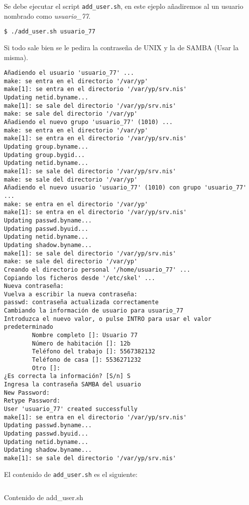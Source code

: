 \documentclass[../main.tex]{subfiles}
\begin{document}
Se debe ejecutar el script \texttt{add\_user.sh},
en este ejeplo añadiremos al un usuario nombrado como
\textit{usuario\_77}.

\begin{listing}[H]
\begin{verbatim}
$ ./add_user.sh usuario_77
\end{verbatim}
\end{listing}

Si todo sale bien se le pedira la contraseña de UNIX y
la de SAMBA (Usar la misma).

\begin{verbatim}
Añadiendo el usuario 'usuario_77' ...
make: se entra en el directorio '/var/yp'
make[1]: se entra en el directorio '/var/yp/srv.nis'
Updating netid.byname...
make[1]: se sale del directorio '/var/yp/srv.nis'
make: se sale del directorio '/var/yp'
Añadiendo el nuevo grupo 'usuario_77' (1010) ...
make: se entra en el directorio '/var/yp'
make[1]: se entra en el directorio '/var/yp/srv.nis'
Updating group.byname...
Updating group.bygid...
Updating netid.byname...
make[1]: se sale del directorio '/var/yp/srv.nis'
make: se sale del directorio '/var/yp'
Añadiendo el nuevo usuario 'usuario_77' (1010) con grupo 'usuario_77' ...
make: se entra en el directorio '/var/yp'
make[1]: se entra en el directorio '/var/yp/srv.nis'
Updating passwd.byname...
Updating passwd.byuid...
Updating netid.byname...
Updating shadow.byname...
make[1]: se sale del directorio '/var/yp/srv.nis'
make: se sale del directorio '/var/yp'
Creando el directorio personal '/home/usuario_77' ...
Copiando los ficheros desde '/etc/skel' ...
Nueva contraseña:
Vuelva a escribir la nueva contraseña:
passwd: contraseña actualizada correctamente
Cambiando la información de usuario para usuario_77
Introduzca el nuevo valor, o pulse INTRO para usar el valor predeterminado
        Nombre completo []: Usuario 77
        Número de habitación []: 12b
        Teléfono del trabajo []: 5567382132
        Teléfono de casa []: 5536271232
        Otro []:
¿Es correcta la información? [S/n] S
Ingresa la contraseña SAMBA del usuario
New Password:
Retype Password:
User 'usuario_77' created successfully
make[1]: se entra en el directorio '/var/yp/srv.nis'
Updating passwd.byname...
Updating passwd.byuid...
Updating netid.byname...
Updating shadow.byname...
make[1]: se sale del directorio '/var/yp/srv.nis'
\end{verbatim}

El contenido de \texttt{add\_user.sh} es el siguiente:
\begin{listing}[H]
\inputminted{bash}{../configs/add_user.sh}
\caption{Contenido de add\_user.sh}
\label{listing:adduser.sh}
\end{listing}
\end{document}
